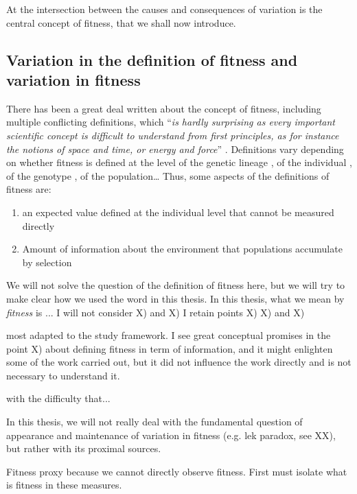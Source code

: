 At the intersection between the causes and consequences of variation is the central concept of fitness, that we  shall now introduce. 

\subsection{Variation in the definition of fitness and variation in fitness}

There has been a great deal written about the concept of fitness, including multiple conflicting definitions, which ``\emph{is hardly surprising as every important scientific concept is difficult to understand from first principles, as for instance the notions of space and time, or energy and force}'' \parencite[p. 1358][]{Wagner2010}. Definitions vary depending on whether fitness is defined at the level of the genetic lineage \parencite[e.g.][]{Akc2016}, of the individual \parencite[e.g.][]{Cam2000}, of the genotype \parencite[e.g.][]{Steiner2012}, of the population\dots
Thus, some aspects of the definitions of fitness are:
\begin{enumerate}
	\item an expected value defined at the individual level that cannot be measured directly \parencite{Brandon1984,Price1996,Krimbas2004}
	\item Amount of information about the environment that populations accumulate by selection \parencite{Frank2012V}
\end{enumerate}


We will not solve the question of the definition of fitness here, but we will try to make clear how we used the word in this thesis. 
In this thesis, what we mean by \emph{fitness} is ...
I will not consider X) and X)
I retain points X) X) and X)

most adapted to the study framework.
I see great conceptual promises in the point X) about defining fitness in term of information, and it might enlighten some of the work carried out, but it did not influence the work directly and is not necessary to understand it.

with the difficulty that...  

In this thesis, we will not really deal with the fundamental question of appearance and maintenance of variation in fitness (e.g. lek paradox, see XX), but rather with its proximal sources.

Fitness proxy because we cannot directly observe fitness. First must isolate what is fitness in these measures. 

